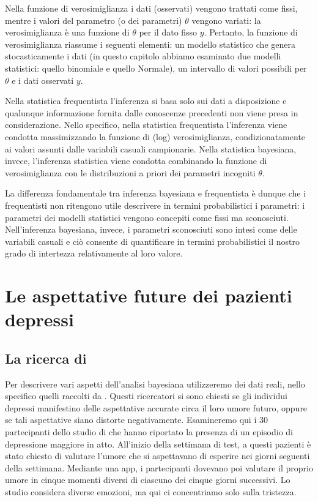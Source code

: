 \documentclass[
  11pt,
]{krantz}
\theoremstyle{definition}
\theoremstyle{definition}
\theoremstyle{definition}
\theoremstyle{definition}
\theoremstyle{remark}
\begin{document}
Nella funzione di verosimiglianza i dati (osservati) vengono trattati come fissi, mentre i valori del parametro (o dei parametri) \(\theta\) vengono variati: la verosimiglianza è una funzione di \(\theta\) per il dato fisso \(y\). Pertanto, la funzione di verosimiglianza riassume i seguenti elementi: un modello statistico che genera stocasticamente i dati (in questo capitolo abbiamo esaminato due modelli statistici: quello binomiale e quello Normale), un intervallo di valori possibili per \(\theta\) e i dati osservati \(y\).

Nella statistica frequentista l'inferenza si basa solo sui dati a disposizione e qualunque informazione fornita dalle conoscenze precedenti non viene presa in considerazione. Nello specifico, nella statistica frequentista l'inferenza viene condotta massimizzando la funzione di (log) verosimiglianza, condizionatamente ai valori assunti dalle variabili casuali campionarie. Nella statistica bayesiana, invece, l'inferenza statistica viene condotta combinando la funzione di verosimiglianza con le distribuzioni a priori dei parametri incogniti \(\theta\).

La differenza fondamentale tra inferenza bayesiana e frequentista è dunque che i frequentisti non ritengono utile descrivere in termini probabilistici i parametri: i parametri dei modelli statistici vengono concepiti come fissi ma sconosciuti. Nell'inferenza bayesiana, invece, i parametri sconosciuti sono intesi come delle variabili casuali e ciò consente di quantificare in termini probabilistici il nostro grado di intertezza relativamente al loro valore.

\hypertarget{appendix:future-exp}{%
\chapter{Le aspettative future dei pazienti depressi}\label{appendix:future-exp}}

\hypertarget{app:zet}{%
\section{\texorpdfstring{La ricerca di \citet{zetschefuture2019}}{La ricerca di @zetschefuture2019}}\label{app:zet}}

Per descrivere vari aspetti dell'analisi bayesiana utilizzeremo dei dati reali, nello specifico quelli raccolti da \citet{zetschefuture2019}. Questi ricercatori si sono chiesti se gli individui depressi manifestino delle aspettative accurate circa il loro umore futuro, oppure se tali aspettative siano distorte negativamente. Esamineremo qui i 30 partecipanti dello studio di \citet{zetschefuture2019} che hanno riportato la presenza di un episodio di depressione maggiore in atto. All'inizio della settimana di test, a questi pazienti è stato chiesto di valutare l'umore che si aspettavano di esperire nei giorni seguenti della settimana. Mediante una app, i partecipanti dovevano poi valutare il proprio umore in cinque momenti diversi di ciascuno dei cinque giorni successivi. Lo studio considera diverse emozioni, ma qui ci concentriamo solo sulla tristezza.
\end{document}
